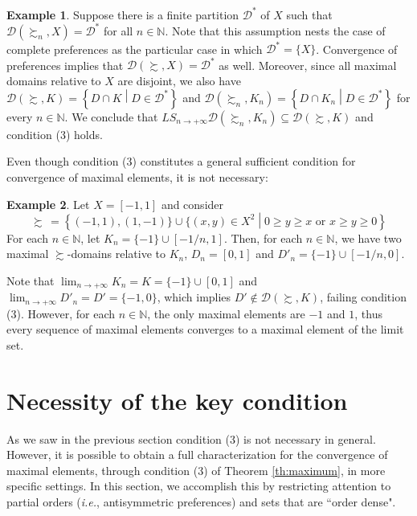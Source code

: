 \documentclass[12pt, oneside]{amsart}
\theoremstyle{definition}
\newtheorem{example}{Example}
\begin{document}
\begin{example}
\label{ex:partition}
Suppose there is a finite partition $\mathcal{D}^*$ of $X$ such that $\mathcal{D}\left(\succsim_n, X\right) = \mathcal{D}^*$ for all $n \in \mathbb{N}$. Note that this assumption nests the case of complete preferences as the particular case in which $\mathcal{D}^*=\{X\}$. Convergence of preferences implies that $\mathcal{D}\left(\succsim, X\right) = \mathcal{D}^*$ as well. Moreover, since all maximal domains relative to $X$ are disjoint, we also have $\mathcal{D}\left(\succsim, K\right) = \left\{D \cap K\middle| D\in \mathcal{D}^*\right\}$ and $\mathcal{D}\left(\succsim_n, K_n\right) = \left\{D \cap K_n\middle| D\in \mathcal{D}^*\right\}$ for every $n \in \mathbb{N}$. We conclude that $LS_{n \to +\infty} \mathcal{D}\left(\succsim_n, K_n\right) \subseteq \mathcal{D}\left(\succsim, K\right)$ and condition (3) holds.
\end{example}

Even though condition (3) constitutes a general sufficient condition for convergence of maximal elements, it is not necessary:

\begin{example}
Let $X = \left[-1, 1\right]$ and consider 
\[
\succsim \hspace{2pt} = \left\{(-1, 1), (1, -1)\} \cup \{(x, y) \in X^2 \middle| 0 \ge y \ge x \text{ or } x \ge y \ge 0 \right\}
\]
For each $n \in \mathbb{N}$, let $K_n = \{-1\} \cup \left[-1/n, 1\right]$. Then, for each $n \in \mathbb{N}$, we have two maximal $\succsim$-domains relative to $K_n$, $D_n = \left[0, 1\right]$ and $D'_n = \{-1\} \cup \left[-1/n,0\right]$.

Note that $\lim_{n \to +\infty} K_n = K = \{-1\} \cup [0, 1]$ and $\lim_{n \to +\infty} D'_n = D' = \{-1, 0\}$, which implies $D' \notin \mathcal{D}\left(\succsim, K\right)$, failing condition (3). However, for each $n \in \mathbb{N}$, the only maximal elements are $-1$ and $1$, thus every sequence of maximal elements converges to a maximal element of the limit set.
\end{example}


\section{Necessity of the key condition}

As we saw in the previous section condition (3) is not necessary in general. However, it is possible to obtain a full characterization for the convergence of maximal elements, through condition (3) of Theorem \ref{th:maximum}, in more specific settings. In this section, we accomplish this by restricting attention to partial orders (\textit{i.e.}, antisymmetric preferences) and sets that are ``order dense".
\end{document}
